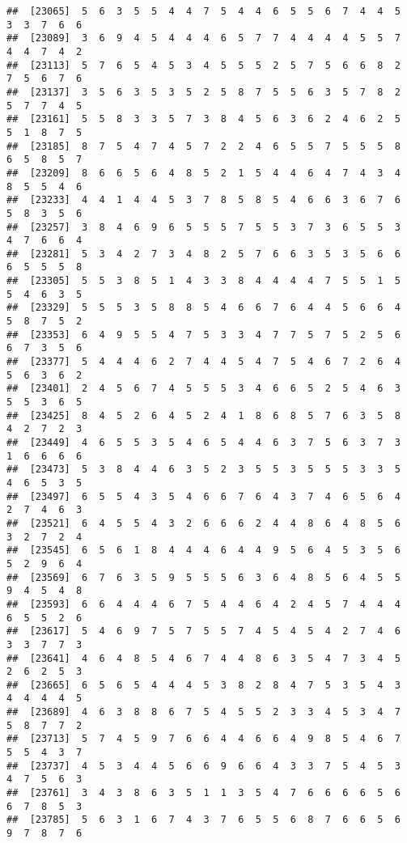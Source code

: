 \documentclass[
]{book}
\begin{document}
\begin{verbatim}
##  [23065]  5  6  3  5  5  4  4  7  5  4  4  6  5  5  6  7  4  4  5  3  3  7  6  6
##  [23089]  3  6  9  4  5  4  4  4  6  5  7  7  4  4  4  4  5  5  7  4  4  7  4  2
##  [23113]  5  7  6  5  4  5  3  4  5  5  5  2  5  7  5  6  6  8  2  7  5  6  7  6
##  [23137]  3  5  6  3  5  3  5  2  5  8  7  5  5  6  3  5  7  8  2  5  7  7  4  5
##  [23161]  5  5  8  3  3  5  7  3  8  4  5  6  3  6  2  4  6  2  5  5  1  8  7  5
##  [23185]  8  7  5  4  7  4  5  7  2  2  4  6  5  5  7  5  5  5  8  6  5  8  5  7
##  [23209]  8  6  6  5  6  4  8  5  2  1  5  4  4  6  4  7  4  3  4  8  5  5  4  6
##  [23233]  4  4  1  4  4  5  3  7  8  5  8  5  4  6  6  3  6  7  6  5  8  3  5  6
##  [23257]  3  8  4  6  9  6  5  5  5  7  5  5  3  7  3  6  5  5  3  4  7  6  6  4
##  [23281]  5  3  4  2  7  3  4  8  2  5  7  6  6  3  5  3  5  6  6  6  5  5  5  8
##  [23305]  5  5  3  8  5  1  4  3  3  8  4  4  4  4  7  5  5  1  5  5  4  6  3  5
##  [23329]  5  5  5  3  5  8  8  5  4  6  6  7  6  4  4  5  6  6  4  5  8  7  5  2
##  [23353]  6  4  9  5  5  4  7  5  3  3  4  7  7  5  7  5  2  5  6  6  7  3  5  6
##  [23377]  5  4  4  4  6  2  7  4  4  5  4  7  5  4  6  7  2  6  4  5  6  3  6  2
##  [23401]  2  4  5  6  7  4  5  5  5  3  4  6  6  5  2  5  4  6  3  5  5  3  6  5
##  [23425]  8  4  5  2  6  4  5  2  4  1  8  6  8  5  7  6  3  5  8  4  2  7  2  3
##  [23449]  4  6  5  5  3  5  4  6  5  4  4  6  3  7  5  6  3  7  3  1  6  6  6  6
##  [23473]  5  3  8  4  4  6  3  5  2  3  5  5  3  5  5  5  3  3  5  4  6  5  3  5
##  [23497]  6  5  5  4  3  5  4  6  6  7  6  4  3  7  4  6  5  6  4  2  7  4  6  3
##  [23521]  6  4  5  5  4  3  2  6  6  6  2  4  4  8  6  4  8  5  6  3  2  7  2  4
##  [23545]  6  5  6  1  8  4  4  4  6  4  4  9  5  6  4  5  3  5  6  5  2  9  6  4
##  [23569]  6  7  6  3  5  9  5  5  5  6  3  6  4  8  5  6  4  5  5  9  4  5  4  8
##  [23593]  6  6  4  4  4  6  7  5  4  4  6  4  2  4  5  7  4  4  4  6  5  5  2  6
##  [23617]  5  4  6  9  7  5  7  5  5  7  4  5  4  5  4  2  7  4  6  3  3  7  7  3
##  [23641]  4  6  4  8  5  4  6  7  4  4  8  6  3  5  4  7  3  4  5  2  6  2  5  3
##  [23665]  6  5  6  5  4  4  4  5  3  8  2  8  4  7  5  3  5  4  3  4  4  4  4  5
##  [23689]  4  6  3  8  8  6  7  5  4  5  5  2  3  3  4  5  3  4  7  5  8  7  7  2
##  [23713]  5  7  4  5  9  7  6  6  4  4  6  6  4  9  8  5  4  6  7  5  5  4  3  7
##  [23737]  4  5  3  4  4  5  6  6  9  6  6  4  3  3  7  5  4  5  3  4  7  5  6  3
##  [23761]  3  4  3  8  6  3  5  1  1  3  5  4  7  6  6  6  6  5  6  6  7  8  5  3
##  [23785]  5  6  3  1  6  7  4  3  7  6  5  5  6  8  7  6  6  5  6  9  7  8  7  6

\end{verbatim}
\end{document}

